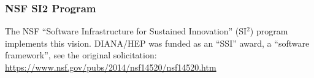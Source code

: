 \begin{frame}
\frametitle{NSF SI2 Program}

The NSF ``Software Infrastructure for Sustained Innovation'' (SI$^2$) program implements this vision. 
\vskip 0.15in
DIANA/HEP was funded as an ``SSI'' award, a ``software framework'', see the original solicitation:
\vskip 0.15in
\small{\url{https://www.nsf.gov/pubs/2014/nsf14520/nsf14520.htm}}
\end{frame}


